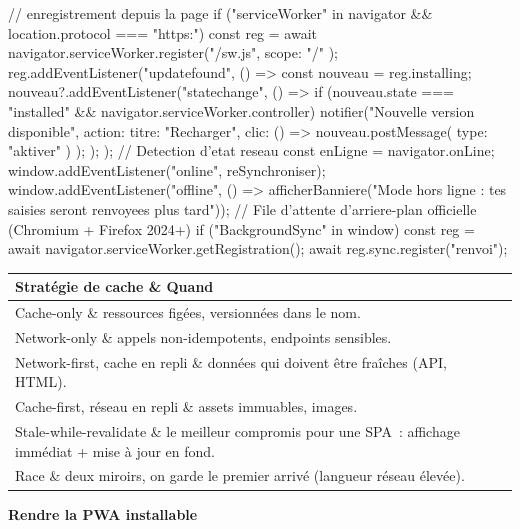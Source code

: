 \documentclass[12pt,a4paper,twoside,openright]{book}
\makeatletter
\newcommand{\etape}[1]{\par\medskip\noindent\textbf{\large #1}\par\smallskip}
\newenvironment{tabz}[1]{\rowcolors{2}{white}{tralight}%
  \small\setlength{\tabcolsep}{5pt}\setlength{\LTpre}{3pt}\setlength{\LTpost}{3pt}%
  \begin{longtable}{@{}#1@{}}\toprule}
  {\bottomrule\end{longtable}\normalfont\setlength{\tabcolsep}{6pt}}
\newcommand{\thd}[1]{\textbf{\color{white}#1}}
\newcommand{\headrow}{\rowcolor{theadbg}}
\makeatother
\begin{document}
\begin{codejs}
// enregistrement depuis la page
if ("serviceWorker" in navigator && location.protocol === "https:") {
  const reg = await navigator.serviceWorker.register("/sw.js", { scope: "/" });
  reg.addEventListener("updatefound", () => {
    const nouveau = reg.installing;
    nouveau?.addEventListener("statechange", () => {
      if (nouveau.state === "installed" && navigator.serviceWorker.controller) {
        notifier("Nouvelle version disponible", { action: { titre: "Recharger", clic: () => nouveau.postMessage({ type: "aktiver" }) } });
      }
    });
  });
}
// Detection d'etat reseau
const enLigne = navigator.onLine;
window.addEventListener("online", reSynchroniser);
window.addEventListener("offline", () => afficherBanniere("Mode hors ligne : tes saisies seront renvoyees plus tard"));
// File d'attente d'arriere-plan officielle (Chromium + Firefox 2024+)
if ("BackgroundSync" in window) { const reg = await navigator.serviceWorker.getRegistration(); await reg.sync.register("renvoi"); }
\end{codejs}

\begin{tabz}{lX}
  \headrow \thd{Strat\'egie de cache} \& \thd{Quand} \\
  \midrule
  Cache-only \& ressources fig\'ees, versionn\'ees dans le nom. \\
  Network-only \& appels non-idempotents, endpoints sensibles. \\
  Network-first, cache en repli \& donn\'ees qui doivent \^etre fra\^iches (API, HTML). \\
  Cache-first, r\'eseau en repli \& assets immuables, images. \\
  Stale-while-revalidate \& le meilleur compromis pour une SPA~: affichage imm\'ediat + mise \`a jour en fond. \\
  Race \& deux miroirs, on garde le premier arriv\'e (langueur r\'eseau \'elev\'ee). \\
\end{tabz}

\etape{Rendre la PWA installable}
\end{document}
